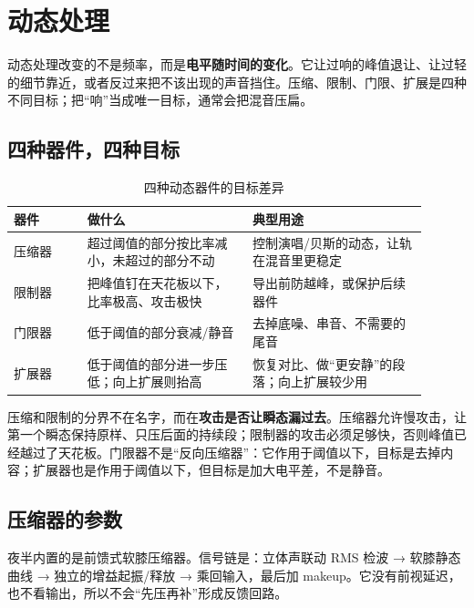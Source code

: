 \chapter{动态处理}
\label{chap:dynamics}


动态处理改变的不是频率，而是\textbf{电平随时间的变化}。它让过响的峰值退让、让过轻的细节靠近，或者反过来把不该出现的声音挡住。压缩、限制、门限、扩展是四种不同目标；把“响”当成唯一目标，通常会把混音压扁。

\section{四种器件，四种目标}

\begin{table}[htbp]
\centering
\small
\begin{tabular}{@{}p{0.16\linewidth}p{0.36\linewidth}p{0.38\linewidth}@{}}
\hline
器件 & 做什么 & 典型用途 \\
\hline
压缩器 & 超过阈值的部分按比率减小，未超过的部分不动 & 控制演唱/贝斯的动态，让轨在混音里更稳定 \\
限制器 & 把峰值钉在天花板以下，比率极高、攻击极快 & 导出前防越峰，或保护后续器件 \\
门限器 & 低于阈值的部分衰减/静音 & 去掉底噪、串音、不需要的尾音 \\
扩展器 & 低于阈值的部分进一步压低；向上扩展则抬高 & 恢复对比、做“更安静”的段落；向上扩展较少用 \\
\hline
\end{tabular}
\caption{四种动态器件的目标差异}
\label{tab:dynamics-kinds}
\end{table}

压缩和限制的分界不在名字，而在\textbf{攻击是否让瞬态漏过去}。压缩器允许慢攻击，让第一个瞬态保持原样、只压后面的持续段；限制器的攻击必须足够快，否则峰值已经越过了天花板。门限器不是“反向压缩器”：它作用于阈值以下，目标是去掉内容；扩展器也是作用于阈值以下，但目标是加大电平差，不是静音。

\section{压缩器的参数}

夜半内置的是前馈式软膝压缩器。信号链是：立体声联动 RMS 检波 → 软膝静态曲线 → 独立的增益起振/释放 → 乘回输入，最后加 makeup。它没有前视延迟，也不看输出，所以不会“先压再补”形成反馈回路。

